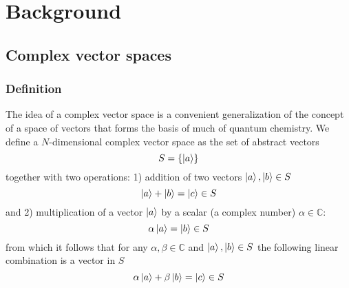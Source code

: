 \documentclass[../Main/chem532-notes.tex]{subfiles}
\begin{document}
\setcounter{chapter}{-1}

\chapter{Background}

\section{Complex vector spaces}

\subsection{Definition}

The idea of a complex vector space is a convenient generalization of the concept of a space of vectors that forms the basis of much of quantum chemistry.
We define a $N$-dimensional complex vector space as the set of abstract vectors
\begin{equation}
S = \{ \ket{a} \}
\end{equation}
together with two operations: 1) addition of two vectors $\ket{a},\ket{b} \in S$
\begin{equation}
\ket{a} +\ket{b} = \ket{c} \in S
\end{equation}
and 2) multiplication of a vector $\ket{a}$ by a scalar (a complex number) $\alpha \in \mathbb{C}$:
\begin{equation}
\alpha \ket{a} = \ket{b} \in S
\end{equation}
from which it follows that for any $\alpha, \beta \in \mathbb{C}$ and $\ket{a},\ket{b} \in S$ the following linear combination is a vector in $S$
\begin{equation}
\alpha \ket{a} + \beta \ket{b} = \ket{c} \in S
\end{equation}
\end{document}
